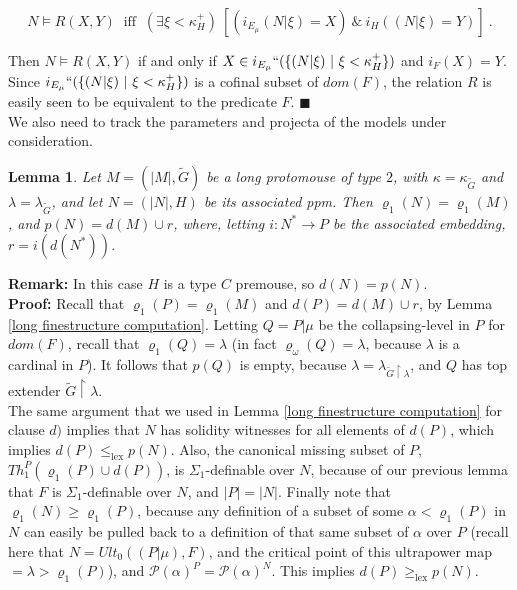 \documentclass[12pt]{article}
\newtheorem{lem}[thm]{Lemma}
\begin{document}
\[
N \models R ( X , Y ) \ \text{ iff } \ ( \exists \xi < \kappa_H^+ ) \  [ ( i_{E_\mu} (N | \xi ) = X) \ \& \ i_H ((N | \xi) = Y ) ] \ .
\]

Then $N \models R (X , Y)$ if and only if $X \in i_{E_\mu}`` ( \{ (N | \xi ) \ | \ \xi < \kappa_H^+ \} )$ and $i_F (X) = Y $.  Since $i_{E_\mu}`` (\{ (N | \xi ) \ | \ \xi < \kappa_H^+ \} )$ is a cofinal subset of $dom (F)$, the relation $R$ is easily seen to be equivalent to the predicate $F$. $\blacksquare$\\



We also need to track the parameters and projecta of the models under consideration.\\

\begin{lem}
Let $M = (|M|, \tilde{G} )$ be a long protomouse of type $2$, with $\kappa = \kappa_{\tilde{G}}$ and $\lambda = \lambda_{\tilde{G}}$, and let $N = ( |N| , H )$ be its associated ppm.  Then $\varrho_1 (N) = \varrho_1 (M)$, and $p(N) =  d(M) \cup r$, where, letting $i: N^* \longrightarrow P$ be the associated embedding, $r = i (d(N^*))$.
\end{lem}

\textbf{Remark:}  In this case $H$ is a type $C$ premouse, so $d (N) = p(N)$.\\

\textbf{Proof:} Recall that $\varrho_1 (P) = \varrho_1 (M)$ and $d(P) =  d(M) \cup r$, by Lemma \ref{long finestructure computation}.  Letting  $Q = P | \mu$ be the collapsing-level in $P$ for $dom (F)$, recall that $\varrho_1 (Q) = \lambda$ (in fact $\varrho_\omega (Q) = \lambda$, because $\lambda$ is a cardinal in $P$).  It follows that $p (Q)$ is empty, because $\lambda = \lambda_{\tilde{G} \restriction \lambda}$, and $Q$ has top extender $\tilde{G} \restriction \lambda$.\\

The same argument that we used in Lemma \ref{long finestructure computation} for clause $d)$ implies that $N$ has solidity witnesses for all elements of $d(P)$, which implies $d(P) \leq_{\text{lex}} p(N)$.  Also, the canonical missing subset of $P$, $Th_1^P (\varrho_1(P) \cup d(P))$, is $\Sigma_1$-definable over $N$, because of our previous lemma that $F$ is $\Sigma_1$-definable over $N$, and $|P| = |N|$.  Finally note that $\varrho_1 (N) \geq \varrho_1(P)$, because any definition of a subset of some $\alpha < \varrho_1 (P)$ in $N$ can easily be pulled back to a definition of that same subset of $\alpha$ over $P$ (recall here that $N = Ult_0 ((P | \mu ) , F )$, and the critical point of this ultrapower map $= \lambda > \varrho_1 (P)$), and $\mathcal{P}(\alpha)^P = \mathcal{P}(\alpha)^N$.  This implies $d(P) \geq_{\text{lex}} p(N)$.\\
\end{document}
